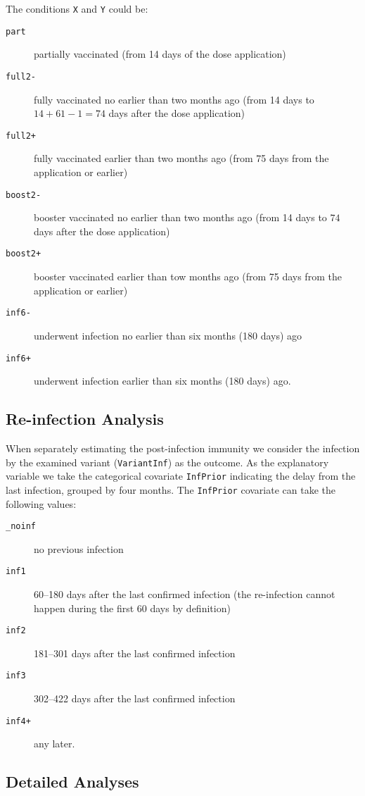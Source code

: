 \documentclass[9pt,onecolumn,twoside,lineno]{pnas-new}
\begin{document}
The conditions {\tt {\m X}} and {\tt {\m Y}}  could be:
\begin{description}
\item[{\tt part}] partially vaccinated (from 14 days of the dose application)
\item[{\tt full2-}] fully vaccinated no earlier than two months ago (from 14 days to $14+61-1=74$ days after the dose application)
\item[{\tt full2+}] fully vaccinated earlier than two months ago (from 75 days from the application or earlier)
\item[{\tt boost2-}] booster vaccinated no earlier than two months ago (from 14 days to $74$ days after the dose application)
\item[{\tt boost2+}] booster vaccinated earlier than tow months ago (from 75 days from the application or earlier)
\item[{\tt inf6-}] underwent infection no earlier than six months (180 days) ago 
\item[{\tt inf6+}] underwent infection earlier than six months (180 days) ago. \end{description}

\subsection*{Re-infection Analysis}

When separately estimating the post-infection immunity we consider the infection by the examined variant ({\tt VariantInf}) as the outcome. As the explanatory variable we take the categorical covariate {\tt InfPrior} indicating the delay from the last infection, grouped by four months. The {\tt InfPrior} covariate can take the following values: 
\begin{description}
\item[{\tt \_noinf}] no previous infection
\item[{\tt inf1}] 60--180 days after the last confirmed infection (the re-infection cannot happen during the first 60 days by definition)
\item[{\tt inf2}] 181--301 days after the last confirmed infection
\item[{\tt inf3}] 302--422 days after the last confirmed infection
\item[{\tt inf4+}] any later.
\end{description}

\subsection*{Detailed Analyses}
\end{document}
